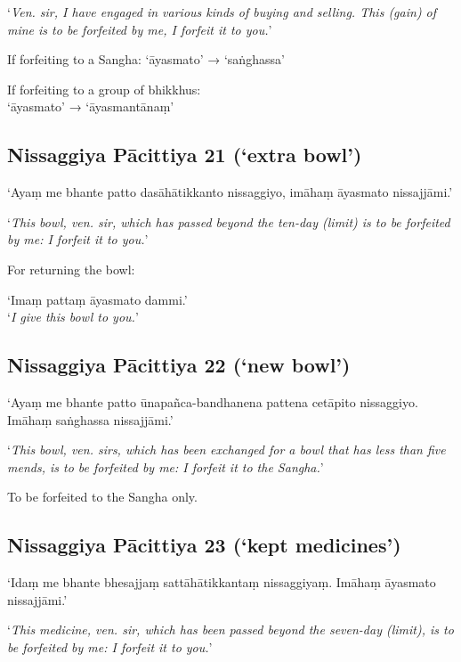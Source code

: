 ‘\emph{Ven. sir, I have engaged in various kinds of buying and selling. This
  (gain) of mine is to be forfeited by me, I forfeit it to you.}’ 

If forfeiting to a Sangha: ‘āyasmato’ → ‘saṅghassa’

If forfeiting to a group of bhikkhus:\\
‘āyasmato’ → ‘āyasmantānaṃ’


\subsection{Nissaggiya Pācittiya 21 (‘extra bowl’)}

‘Ayaṃ me bhante patto dasāhātikkanto nissaggiyo, imāhaṃ āyasmato nissajjāmi.’

‘\emph{This bowl, ven. sir, which has passed beyond the ten-day (limit) is to be
  forfeited by me: I forfeit it to you.}’


For returning the bowl:

‘Imaṃ pattaṃ āyasmato dammi.’\\
‘\emph{I give this bowl to you.}’ 

\subsection{Nissaggiya Pācittiya 22 (‘new bowl’)}

‘Ayaṃ me bhante patto ūnapañca-bandhanena pattena cetāpito nissaggiyo. Imāhaṃ
saṅghassa nissajjāmi.’

‘\emph{This bowl, ven. sirs, which has been exchanged for a bowl that has less
  than five mends, is to be forfeited by me: I forfeit it to the Sangha.}’

To be forfeited to the Sangha only. 

\subsection{Nissaggiya Pācittiya 23 (‘kept medicines’)}

‘Idaṃ me bhante bhesajjaṃ sattāhātikkantaṃ nissaggiyaṃ. Imāhaṃ āyasmato
nissajjāmi.’

‘\emph{This medicine, ven. sir, which has been passed beyond the seven-day
  (limit), is to be forfeited by me: I forfeit it to you.}’

